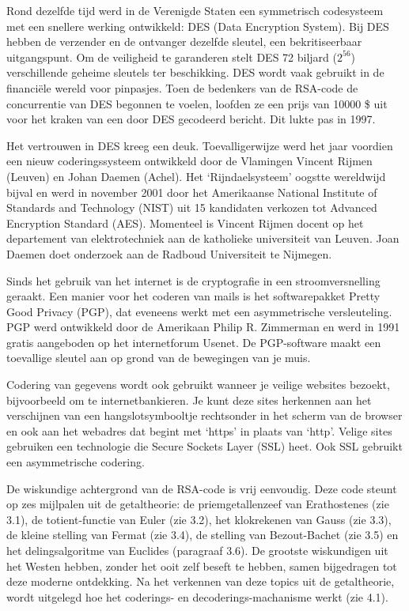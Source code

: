 Rond dezelfde tijd werd in de Verenigde Staten een symmetrisch codesysteem met een snellere werking ontwikkeld: DES (Data Encryption System). Bij DES hebben de verzender en de ontvanger dezelfde sleutel, een bekritiseerbaar uitgangspunt. Om de veiligheid te garanderen stelt DES 72 biljard ($2^{56}$) verschillende geheime sleutels ter beschikking. DES wordt vaak gebruikt in de financiële wereld voor pinpasjes. Toen de bedenkers van de RSA-code de concurrentie van DES begonnen te voelen, loofden ze een prijs van 10000 \$ uit voor het kraken van een door DES gecodeerd bericht. Dit lukte pas in 1997.

Het vertrouwen in DES kreeg een deuk. Toevalligerwijze werd het jaar voordien een nieuw coderingssysteem ontwikkeld door de Vlamingen Vincent Rijmen (Leuven) en Johan Daemen (Achel). Het ‘Rijndaelsysteem’ oogstte wereldwijd bijval en werd in november 2001 door het Amerikaanse National Institute of Standards and Technology (NIST) uit 15 kandidaten verkozen tot Advanced Encryption Standard (AES). Momenteel is Vincent Rijmen docent op het departement van elektrotechniek aan de katholieke universiteit van Leuven. Joan Daemen doet onderzoek aan de Radboud Universiteit te Nijmegen.

Sinds het gebruik van het internet is de cryptografie  in een stroomversnelling geraakt. Een manier voor het coderen van mails is het softwarepakket Pretty Good Privacy (PGP), dat eveneens werkt met een asymmetrische versleuteling. PGP werd ontwikkeld door de Amerikaan Philip R. Zimmerman en werd in 1991 gratis aangeboden op het internetforum Usenet. De PGP-software maakt een toevallige sleutel aan op grond van de bewegingen van je muis. 

Codering van gegevens wordt ook gebruikt wanneer je veilige websites bezoekt, bijvoorbeeld om te internetbankieren. Je kunt deze sites herkennen aan het verschijnen van een hangslotsymbooltje rechtsonder in het scherm van de browser en ook aan het webadres dat begint met ‘https’ in plaats van ‘http’. Velige sites gebruiken een technologie die Secure Sockets Layer (SSL) heet. Ook SSL gebruikt een asymmetrische codering. 

De wiskundige achtergrond van de RSA-code is vrij eenvoudig. Deze code steunt op zes mijlpalen uit de getaltheorie: de priemgetallenzeef van Erathostenes (zie 3.1), de totient-functie van Euler (zie 3.2), het klokrekenen van Gauss (zie 3.3), de kleine stelling van Fermat (zie 3.4), de stelling van Bezout-Bachet (zie 3.5) en het delingsalgoritme van Euclides (paragraaf 3.6). De grootste wiskundigen uit het Westen hebben, zonder het ooit zelf beseft te hebben, samen bijgedragen tot deze moderne ontdekking. Na het verkennen van deze topics uit de getaltheorie, wordt uitgelegd hoe het coderings- en decoderings-machanisme werkt (zie 4.1). 

